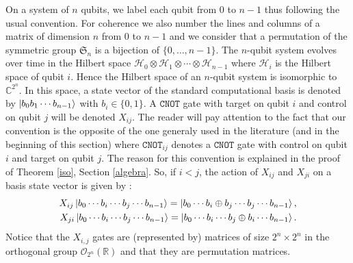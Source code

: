 \documentclass[a4paper,12pt,fleqn]{article}
\newcommand\cnot{\mathtt{CNOT}}
\newcommand\HH{\mathcal{H}}
\newcommand\R{\mathbb{R}}
\newcommand\C{\mathbb{C}}
\newcommand\SYM[1][n]{\mathfrak{S}_{#1}}
\begin{document}
On a system of $n$ qubits, we label each qubit from 0 to $n-1$ thus following the usual convention. For coherence we also number
the lines and columns of a matrix of dimension $n$ from 0 to $n-1$ and we consider that a permutation of the symmetric group $\SYM$ is a bijection of $\{0,\dots,n-1\}$. The $n$-qubit system evolves over time in the Hilbert space $\HH_0\otimes \HH_1\otimes\cdots\otimes \HH_{n-1}$ where $\HH_i$ is the Hilbert space of
qubit $i$. Hence the Hilbert space of an $n$-qubit system is isomorphic to $\C^{2^n}$. In this space, a state vector of the standard computational basis is denoted by $\ket{b_0b_1\cdots b_{n-1}}$ with $b_i\in\{0,1\}$. A $\cnot$ gate with target on qubit $i$ and control on qubit $j$ will be denoted $X_{ij}$. The reader will pay attention to the fact that our convention is the opposite of the one generaly used in the literature (and in the beginning of this section) where $\cnot_{ij}$ denotes a $\cnot$ gate with control on qubit $i$ and target on qubit $j$. The reason for this convention is explained  in the proof of Theorem \ref{iso}, Section \ref{algebra}. So, if $i<j$, the action of $X_{ij}$ and $X_{ji}$ on a basis state vector is given by :
\begin{align}
  X_{ij}\ket{b_0\cdots b_i\cdots b_j\cdots b_{n-1}}=\ket{b_0\cdots b_i\oplus b_j\cdots b_j\cdots b_{n-1}},\label{cnotij}\\
  X_{ji}\ket{b_0\cdots b_i\cdots b_j\cdots b_{n-1}}=\ket{b_0\cdots b_i\cdots b_j\oplus b_i\cdots b_{n-1}}.\label{cnotji}
\end{align}
Notice that the $X_{i,j}$ gates are (represented by) matrices of size $2^n\times 2^n$ in the orthogonal group $\mathcal{O}_{2^n}(\R)$  and that they are permutation matrices.
\end{document}
